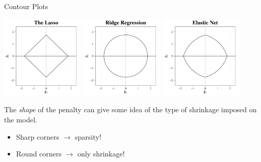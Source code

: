 \documentclass[8pt]{beamer}
\begin{document}
\begin{frame}{\color{white} Contour Plots}

\begin{center}
    \centering
    \includegraphics[width = 0.3\textwidth]{cont_lasso.pdf}
    \includegraphics[width = 0.3\textwidth]{cont_ridge.pdf}
    \includegraphics[width = 0.3\textwidth]{cont_enet.pdf}
\end{center}

The \textit{shape} of the penalty can give some idea of the type of shrinkage imposed on the model.
\begin{itemize}
    \item Sharp corners $\to$ sparsity! \Laughey[1.5][yellow][pink]
    \item Round corners $\to$ only shrinkage!
\end{itemize}
    
\end{frame}
\end{document}

